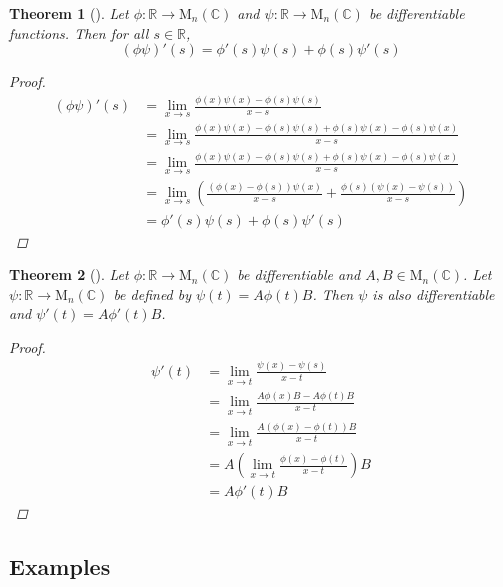 \documentclass[letterpaper, 10pt]{article}
\theoremstyle{theostyle}
\newtheorem{theorem}{Theorem}[section]
\newenvironment{thmstyle}[1][]{%
    \begin{theorem}[#1]\leavevmode\vspace{-\baselineskip}\myquote%
    }{\endmyquote\end{theorem}}
\begin{document}
\begin{thmstyle}
    Let \(\phi : \mathbb{R} \rightarrow \mathrm{M}_n(\mathbb{C})\) and \(\psi : \mathbb{R} \rightarrow \mathrm{M}_n(\mathbb{C})\) be differentiable functions.
    Then for all \(s \in \mathbb{R}\),
    \[(\phi \psi)'(s) = \phi'(s)\psi(s)  +\phi(s)\psi'(s)\]
    \begin{proof}
        \begin{align*}
            (\phi \psi)'(s) &= \lim_{x \to s} \frac{\phi(x)\psi(x) - \phi(s)\psi(s)}{x-s}\\
            &= \lim_{x \to s} \frac{\phi(x)\psi(x) - \phi(s)\psi(s) + \phi(s)\psi(x) - \phi(s)\psi(x)}{x-s}\\
            &= \lim_{x \to s} \frac{\phi(x)\psi(x) - \phi(s)\psi(s) + \phi(s)\psi(x) - \phi(s)\psi(x)}{x-s}\\
            &= \lim_{x \to s} \left(\frac{\left(\phi(x) - \phi(s) \right) \psi(x)}{x-s} + \frac{\phi(s)\left(\psi(x)-\psi(s) \right)}{x-s}\right)\\
            &= \phi'(s)\psi(s)  +\phi(s)\psi'(s)
        \end{align*}
    \end{proof}
\end{thmstyle}

\begin{thmstyle}
    Let \(\phi : \mathbb{R} \rightarrow \mathrm{M}_n(\mathbb{C})\) be differentiable and \(A,B \in \mathrm{M}_n(\mathbb{C})\).
    Let \(\psi : \mathbb{R} \rightarrow \mathrm{M}_n(\mathbb{C})\) be defined by \(\psi(t) = A \phi(t) B\).
    Then \(\psi\) is also differentiable and \(\psi'(t) = A \phi'(t) B\).
    \begin{proof}
        \begin{align*}
            \psi ' (t) &= \lim_{x \to t} \frac{\psi(x) - \psi(s)}{x-t}\\
            &= \lim_{x \to t} \frac{A \phi(x) B - A \phi(t) B}{x-t}\\
            &= \lim_{x \to t} \frac{A \left(\phi(x) - \phi(t) \right)B}{x-t}\\
            &= A \left(\lim_{x \to t} \frac{\phi(x) - \phi(t)}{x-t} \right) B\\
            &= A \phi'(t) B
        \end{align*}
    \end{proof}
\end{thmstyle}


\subsection{Examples}
\end{document}
